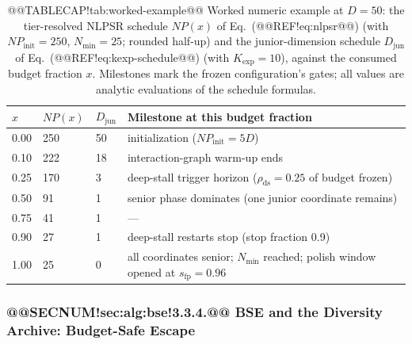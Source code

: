 \documentclass[10pt,a4paper]{article}
\begin{document}
\begin{table}[H]
\caption{@@TABLECAP!tab:worked-example@@ Worked numeric example at $D=50$: the tier-resolved NLPSR
schedule $NP(x)$ of Eq.~(@@REF!eq:nlpsr@@) (with $NP_{\text{init}}=250$,
$N_{\min}=25$; rounded half-up) and the junior-dimension schedule
$D_{\text{jun}}$ of Eq.~(@@REF!eq:kexp-schedule@@) (with
$K_{\exp}=10$), against the consumed budget fraction $x$. Milestones
mark the frozen configuration's gates; all values are analytic
evaluations of the schedule formulas.}
\label{tab:worked-example}
\small
\begin{tabular}{llll}
\toprule
$x$ & $NP(x)$ & $D_{\text{jun}}$ & Milestone at this budget fraction\\
\midrule
0.00 & 250 & 50 & initialization ($NP_{\text{init}}=5D$)\\
0.10 & 222 & 18 & interaction-graph warm-up ends\\
0.25 & 170 & 3  & deep-stall trigger horizon ($\rho_{\text{ds}}=0.25$ of budget frozen)\\
0.50 & 91  & 1  & senior phase dominates (one junior coordinate remains)\\
0.75 & 41  & 1  & ---\\
0.90 & 27  & 1  & deep-stall restarts stop (stop fraction 0.9)\\
1.00 & 25  & 0  & all coordinates senior; $N_{\min}$ reached; polish window opened at $s_{\text{fp}}=0.96$\\
\bottomrule
\end{tabular}
\end{table}




\subsubsection{@@SECNUM!sec:alg:bse!3.3.4.@@ BSE and the Diversity Archive: Budget-Safe Escape}\label{sec:alg:bse}
\end{document}
